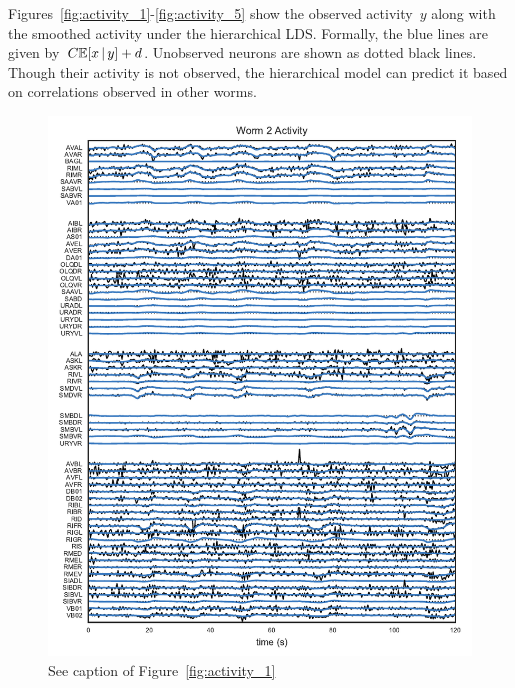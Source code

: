 \documentclass{article}
\begin{document}
Figures~\ref{fig:activity_1}-\ref{fig:activity_5} show the observed
activity~$y$ along with the smoothed activity under the hierarchical
LDS.  Formally, the blue lines are given by~$C \mathbb{E}[x \,|\, y] +
d$. Unobserved neurons are shown as dotted black lines.  Though their
activity is not observed, the hierarchical model can predict it based
on correlations observed in other worms. 

\begin{figure}[h]
  \centering
  \includegraphics[width=5.5in]{figures/lds/y_1}
  \caption{See caption of Figure~\ref{fig:activity_1}}
  \label{fig:activity_2}
\end{figure}
\end{document}

